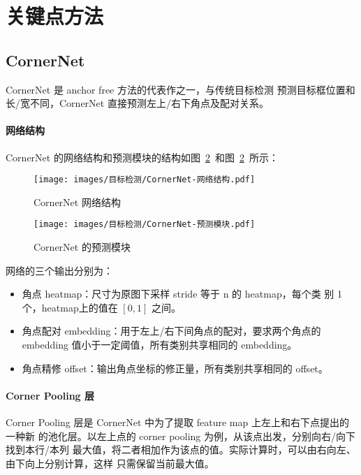\section{关键点方法}

\subsection{CornerNet}
\label{sec:CornerNet}
CornerNet\cite{2018-CornerNet} 是 anchor free 方法的代表作之一，与传统目标检测
预测目标框位置和长/宽不同，CornerNet 直接预测左上/右下角点及配对关系。

\paragraph{网络结构}
CornerNet 的网络结构和预测模块的结构如图~\ref{fig:CornerNet-network}~和图~\ref{fig:CornerNet-network}~所示：

\begin{figure}[ht]
  \centering
  \texttt{[image: images/目标检测/CornerNet-网络结构.pdf]}
  \caption{CornerNet 网络结构}
  \label{fig:CornerNet-network}
\end{figure}

\begin{figure}[ht]
  \centering
  \texttt{[image: images/目标检测/CornerNet-预测模块.pdf]}
  \caption{CornerNet 的预测模块}
  \label{fig:CornerNet-network}
\end{figure}

网络的三个输出分别为：

\begin{itemize}
  \item 角点 heatmap：尺寸为原图下采样 stride 等于 n 的 heatmap，每个类
    别 1 个，heatmap上的值在 $[0, 1]$ 之间。
  \item 角点配对 embedding：用于左上/右下间角点的配对，要求两个角点的 embedding
    值小于一定阈值，所有类别共享相同的 embedding。
  \item 角点精修 offset：输出角点坐标的修正量，所有类别共享相同的 offset。
\end{itemize}

\paragraph{Corner Pooling 层}
Corner Pooling 层是 CornerNet 中为了提取 feature map 上左上和右下点提出的一种新
的池化层。以左上点的 corner pooling 为例，从该点出发，分别向右/向下找到本行/本列
最大值，将二者相加作为该点的值。实际计算时，可以由右向左、由下向上分别计算，这样
只需保留当前最大值。

